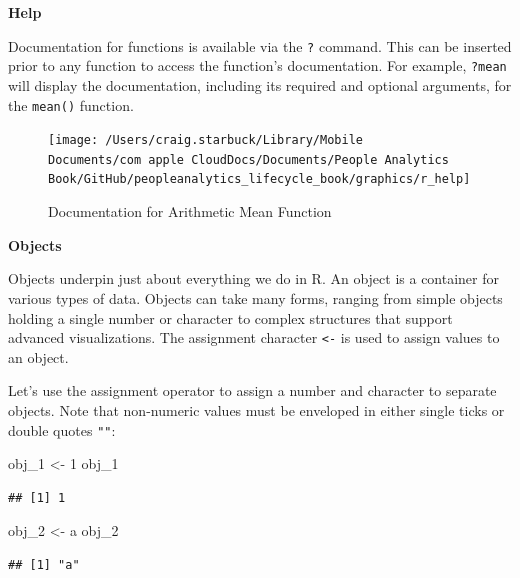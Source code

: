 \documentclass[
]{book}
\newenvironment{Shaded}{\begin{snugshade}}{\end{snugshade}}
\newcommand{\DecValTok}[1]{\textcolor[rgb]{0.00,0.00,0.81}{#1}}
\newcommand{\NormalTok}[1]{#1}
\newcommand{\OtherTok}[1]{\textcolor[rgb]{0.56,0.35,0.01}{#1}}
\newcommand{\StringTok}[1]{\textcolor[rgb]{0.31,0.60,0.02}{#1}}
\begin{document}
\textbf{Help}

Documentation for functions is available via the \texttt{?} command. This can be inserted prior to any function to access the function's documentation. For example, \texttt{?mean} will display the documentation, including its required and optional arguments, for the \texttt{mean()} function.

\begin{figure}

{\centering \texttt{[image: /Users/craig.starbuck/Library/Mobile Documents/com~apple~CloudDocs/Documents/People Analytics Book/GitHub/peopleanalytics\_lifecycle\_book/graphics/r\_help]} 

}

\caption{Documentation for Arithmetic Mean Function}\label{fig:r-help}
\end{figure}

\textbf{Objects}

Objects underpin just about everything we do in R. An object is a container for various types of data. Objects can take many forms, ranging from simple objects holding a single number or character to complex structures that support advanced visualizations. The assignment character \texttt{\textless{}-} is used to assign values to an object.

Let's use the assignment operator to assign a number and character to separate objects. Note that non-numeric values must be enveloped in either single ticks \texttt{\textquotesingle{}\textquotesingle{}} or double quotes \texttt{""}:

\begin{Shaded}
\begin{Highlighting}[]
\NormalTok{obj\_1 }\OtherTok{\textless{}{-}} \DecValTok{1}
\NormalTok{obj\_1}
\end{Highlighting}
\end{Shaded}

\begin{verbatim}
## [1] 1
\end{verbatim}

\begin{Shaded}
\begin{Highlighting}[]
\NormalTok{obj\_2 }\OtherTok{\textless{}{-}} \StringTok{\textquotesingle{}a\textquotesingle{}}
\NormalTok{obj\_2}
\end{Highlighting}
\end{Shaded}

\begin{verbatim}
## [1] "a"
\end{verbatim}
\end{document}
